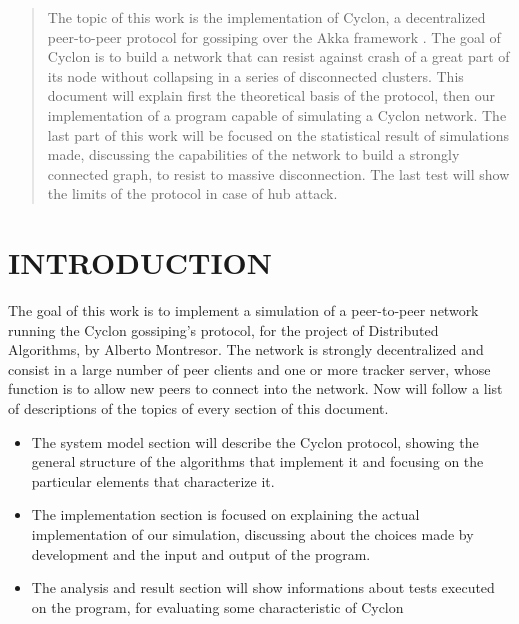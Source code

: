 \documentclass[a4paper,12pt,notitlepage]{article} %
\begin{document}

\begin{abstract}
   	 	
    The topic of this work is the implementation of Cyclon, a decentralized
    peer-to-peer protocol for gossiping over the Akka framework \cite{Akka}.
    The goal of Cyclon is to build a network that can resist against crash of 
    a great part of its node without  collapsing in a series of disconnected clusters.
    This document will explain first the theoretical basis of the protocol, then 
    our implementation of a program capable of simulating a Cyclon network. 
    The last part of this work will be focused on the statistical
    result of simulations made, discussing the capabilities of the network
    to build a strongly connected graph, to resist to massive disconnection. The 
    last test will show the limits of the protocol in case of hub attack.
  

\end{abstract}
\newpage



\section{INTRODUCTION}

The goal of this work is to implement a simulation of a peer-to-peer network running
 the Cyclon gossiping's protocol, for the project of Distributed Algorithms, by Alberto Montresor. 
 The network is strongly decentralized and consist in a 
 large number of peer clients and one or more tracker server, whose function is to allow new 
 peers to connect into the network. Now will follow a list of descriptions of the topics of every
 section of this document.

 \begin{itemize}
 	\item The system model section will describe the Cyclon protocol, showing  the general structure of 
 	the algorithms that implement it and focusing on the particular elements that characterize it.
 	\item The implementation section is focused on explaining the actual implementation of 
 	our simulation, discussing about the choices made by development and the input and
 	 output of the program.
 	\item The analysis and result section will show informations about tests executed on 
 	the program, for evaluating some characteristic of Cyclon
 \end{itemize}
\end{document}
